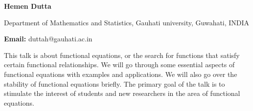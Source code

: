 \documentclass[twoside,11pt]{amsart}
\begin{document}
\centerline{\textbf{ Hemen Dutta }}
\vskip 2mm
\begin{flushleft}
Department of Mathematics and Statistics, Gauhati university, Guwahati, INDIA
\end{flushleft}
\vskip 2mm
\begin{flushleft}
{\bf Email:} duttah@gauhati.ac.in
\end{flushleft}
\vskip 10mm
This talk is about functional equations, or the search for functions that satisfy certain
functional relationships. We will go through some essential aspects of functional equations
with examples and applications. We will also go over the stability of functional equations
briefly. The primary goal of the talk is to stimulate the interest of students and new
researchers in the area of functional equations.
\vskip 5mm
\newpage




\vspace*{85mm}
\end{document}
